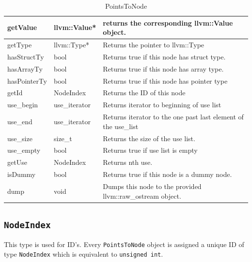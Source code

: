 \documentclass[a4paper,12pt]{report}
\begin{document}
\begin{table}[]
\centering
\caption{PointsToNode}
\label{points-to-node}
\begin{tabular}{|l|l|l|}
\hline
getValue     & llvm::Value*  & returns the corresponding llvm::Value object.                               \\ \hline
getType      & llvm::Type*   & Returns the pointer to llvm::Type                                           \\ \hline
hasStructTy  & bool          & Returns true if this node has struct type.                                  \\ \hline
hasArrayTy   & bool          & Returns true if this node has array type.                                   \\ \hline
hasPointerTy & bool          & Returns true if this node has pointer type                                  \\ \hline
getId        & NodeIndex     & Returns the ID of this node                                                 \\ \hline
use\_begin   & use\_iterator & Returns iterator to beginning of use list                                   \\ \hline
use\_end     & use\_iterator & Returns iterator to the one past last element of the use\_list              \\ \hline
use\_size    & size\_t       & Returns the size of the use list.                                           \\ \hline
use\_empty   & bool          & Returns true if use list is empty                                           \\ \hline
getUse       & NodeIndex     & Returns nth use.                                                            \\ \hline
isDummy      & bool          & Returns true if this node is a dummy node.                                  \\ \hline
dump         & void          & Dumps this node to the provided llvm::raw\_ostream object.                  \\ \hline
\end{tabular}
\end{table}



\subsection{\texttt{NodeIndex}}
This type is used for ID's. Every \texttt{PointsToNode} object is assigned
a unique ID of type \texttt{NodeIndex} which is equivalent to \texttt{unsigned int}.
\end{document}

